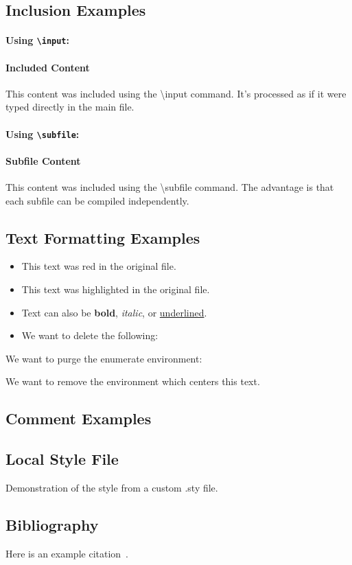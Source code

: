 \subsection{Inclusion Examples}
\paragraph{Using \texttt{\textbackslash input}:}
\paragraph{Included Content}
This content was included using the \textbackslash input command. It's processed as if it were typed directly in the main file.

\paragraph{Using \texttt{\textbackslash subfile}:}



\paragraph{Subfile Content}
This content was included using the \textbackslash subfile command. The advantage is that each subfile can be compiled independently.


\subsection{Text Formatting Examples}
\begin{itemize}
\item This text was red in the original file.
\item This text was highlighted in the original file.
\item Text can also be \textbf{bold}, \textit{italic}, or \underline{underlined}.
\item We want to delete the following: 
\end{itemize}

We want to purge the enumerate environment:



We want to remove the environment which centers this text.


\subsection{Comment Examples}


\subsection{Local Style File}
Demonstration of the  style from a custom .sty file.

\subsection{Bibliography}
Here is an example citation~\cite{example2023}.

\printbibliography


